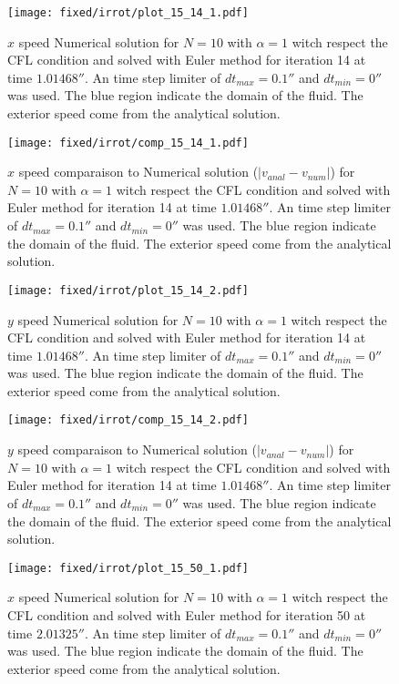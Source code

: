 \begin{figure}
\texttt{[image: fixed/irrot/plot\_15\_14\_1.pdf]}
\caption{$x$ speed Numerical solution for $N=10$ with $\alpha=1$ witch respect the CFL condition and solved with Euler method
for iteration 14 at time $\unit{1.01468}{\second}$.
An time step limiter of $dt_{max}=\unit{0.1}{\second}$ and $dt_{min}=\unit{0}{\second}$ was used.
The blue region indicate the domain of the fluid. The exterior speed come from the analytical solution.
\label{fix:plot_15_14_1}
}
\end{figure}

\begin{figure}
\texttt{[image: fixed/irrot/comp\_15\_14\_1.pdf]}
\caption{$x$ speed comparaison to Numerical solution ($|v_{anal}-v_{num}|$) for $N=10$ with $\alpha=1$ witch respect the CFL condition and solved with Euler method
for iteration 14 at time $\unit{1.01468}{\second}$.
An time step limiter of $dt_{max}=\unit{0.1}{\second}$ and $dt_{min}=\unit{0}{\second}$ was used.
The blue region indicate the domain of the fluid. The exterior speed come from the analytical solution.
\label{fix:comp_15_14_1}
}
\end{figure}

\begin{figure}
\texttt{[image: fixed/irrot/plot\_15\_14\_2.pdf]}
\caption{$y$ speed Numerical solution for $N=10$ with $\alpha=1$ witch respect the CFL condition and solved with Euler method
for iteration 14 at time $\unit{1.01468}{\second}$.
An time step limiter of $dt_{max}=\unit{0.1}{\second}$ and $dt_{min}=\unit{0}{\second}$ was used.
The blue region indicate the domain of the fluid. The exterior speed come from the analytical solution.
\label{fix:plot_15_14_2}
}
\end{figure}

\begin{figure}
\texttt{[image: fixed/irrot/comp\_15\_14\_2.pdf]}
\caption{$y$ speed comparaison to Numerical solution ($|v_{anal}-v_{num}|$) for $N=10$ with $\alpha=1$ witch respect the CFL condition and solved with Euler method
for iteration 14 at time $\unit{1.01468}{\second}$.
An time step limiter of $dt_{max}=\unit{0.1}{\second}$ and $dt_{min}=\unit{0}{\second}$ was used.
The blue region indicate the domain of the fluid. The exterior speed come from the analytical solution.
\label{fix:comp_15_14_2}
}
\end{figure}

\begin{figure}
\texttt{[image: fixed/irrot/plot\_15\_50\_1.pdf]}
\caption{$x$ speed Numerical solution for $N=10$ with $\alpha=1$ witch respect the CFL condition and solved with Euler method
for iteration 50 at time $\unit{2.01325}{\second}$.
An time step limiter of $dt_{max}=\unit{0.1}{\second}$ and $dt_{min}=\unit{0}{\second}$ was used.
The blue region indicate the domain of the fluid. The exterior speed come from the analytical solution.
\label{fix:plot_15_50_1}
}
\end{figure}

